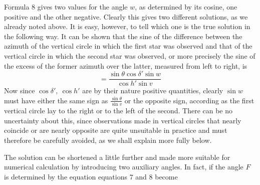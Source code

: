 Formula $8$ gives two values for the angle $w$, as determined by its cosine, one positive and the other negative. Clearly this gives two different solutions, as we already noted above. It is easy, however, to tell which one is the true solution in the following way. It can be shown that the sine of the difference between the azimuth of the vertical circle in which the first star was observed and that of the vertical circle in which the second star was observed, or more precisely the sine of the excess of the former azimuth over the latter, measured from left to right, is
\[
=\frac{\sin\theta\cos\delta'\sin w}{\cos h'\sin v}
\]
Now since $\cos\delta',\ \cos h'$ are by their nature positive quantities, clearly $\sin w$ must have either the same sign as $\frac{\sin\theta}{\sin v}$ or the opposite sign, according as the first vertical circle lay to the right or to the left of the second. There can be no uncertainty about this, since observations made in vertical circles that nearly coincide or are nearly opposite are quite unsuitable in practice and must therefore be carefully avoided, as we shall explain more fully below.

The solution can be shortened a little further and made more suitable for numerical calculation by introducing two auxiliary angles. In fact, if the angle $F$ is determined by the equation
equations $7$ and $8$ become

